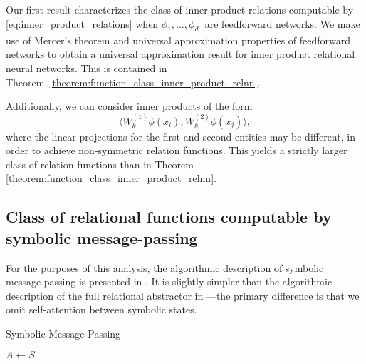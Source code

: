 Our first result characterizes the class of inner product relations computable by \eqref{eq:inner_product_relations} when \(\phi_{1}, \ldots, \phi_{d_r}\) are feedforward networks. We make use of Mercer's theorem and universal approximation properties of feedforward networks to obtain a universal approximation result for inner product relational neural networks. This is contained in Theorem~\ref{theorem:function_class_inner_product_relnn}.

Additionally, we can consider inner products of the form
\begin{equation}
	\label{eq:nonsymmetric_inner_product_relnn}
	\langle W_k^{(1)} \phi(x_i), W_k^{(2)} \phi(x_j) \rangle,
\end{equation}
\noindent where the linear projections for the first and second entities may be different, in order to achieve non-symmetric relation functions. This yields a strictly larger class of relation functions than in Theorem \ref{theorem:function_class_inner_product_relnn}.

\subsection{Class of relational functions computable by symbolic message-passing}
\label{ssec:function_class_symbolic_mp}
For the purposes of this analysis, the algorithmic description of symbolic message-passing is presented in . It is slightly simpler than the algorithmic description of the full relational  abstractor in ---the primary difference is that we omit self-attention between symbolic states.

\begin{algorithm}[ht!]
	\caption{Symbolic Message-Passing}\label{alg:symbolic_mp}

	\vspace{1em}

	\(A \gets S\)

\end{algorithm}



